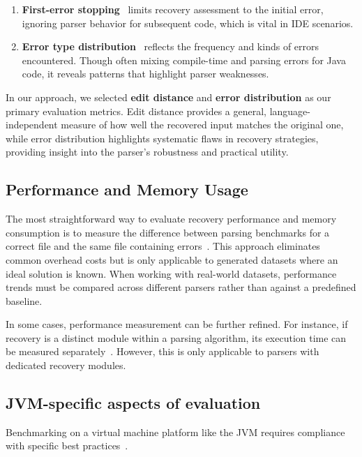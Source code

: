 \documentclass[conference]{IEEEtran}
\begin{document}
\begin{enumerate}
    \item \textbf{First-error stopping}~\cite{first-errors, error-frequence} limits recovery assessment to the initial error, ignoring parser behavior for subsequent code, which is vital in IDE scenarios.

    \item \textbf{Error type distribution}~\cite{error-frequence} reflects the frequency and kinds of errors encountered. Though often mixing compile-time and parsing errors for Java code, it reveals patterns that highlight parser weaknesses.
\end{enumerate}

In our approach, we selected \textbf{edit distance} and \textbf{error distribution} as our primary evaluation metrics.  Edit distance provides a general, language-independent measure of how well the recovered input matches the original one, while error distribution highlights systematic flaws in recovery strategies, providing insight into the parser’s robustness and practical utility.


\subsection{Performance and Memory Usage }
The most straightforward way to evaluate recovery performance and memory consumption is to measure the difference between parsing benchmarks for a correct file and the same file containing errors~\cite{natural_recovery, fuzz_recovery}. This approach eliminates common overhead costs but is only applicable to generated datasets where an ideal solution is known.  When working with real-world datasets, performance trends must be compared across different parsers rather than against a predefined baseline.

In some cases, performance measurement can be  further refined. For instance, if recovery is a distinct module  within a parsing algorithm, its execution time can be measured separately~\cite{panic}. However, this is only applicable to parsers with dedicated recovery modules.

\subsection{JVM-specific aspects of evaluation}
Benchmarking on a virtual machine platform like the JVM requires compliance with specific best practices~\cite{bench}.
\end{document}
